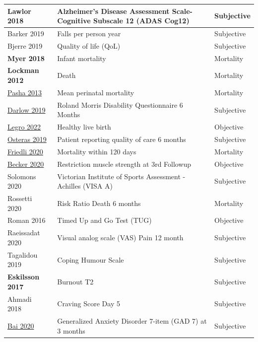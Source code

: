 \documentclass[sn-mathphys,Numbered]{sn-jnl}%
\begin{document}
\begin{longtable}{|p{4.2cm}|p{5.2cm}|p{1.9cm}|}
\hline
Lawlor 2018~\cite{lawlor2018nilvadipine} & Alzheimer's Disease Assessment Scale-Cognitive Subscale 12 (ADAS Cog12) & Subjective \\
\hline
Barker 2019~\cite{barker2019evaluation} & Falls per person year & Subjective \\
\hline
Bjerre 2019~\cite{bjerre2019community} & Quality of life (QoL) & Subjective \\
\hline
\textbf{Myer 2018}~\cite{myer2018integration} & Infant mortality & Mortality \\
\hline
\textbf{Lockman 2012}~\cite{lockman2012nevirapine} & Death & Mortality \\
\hline
\underline{Pasha 2013}~\cite{pasha2013combined} & Mean perinatal mortality & Mortality \\
\hline
\underline{Darlow 2019}~\cite{darlow2019fear} & Roland Morris Disability Questionnaire 6 Months & Subjective \\
\hline
\underline{Legro 2022}\cite{legro2022effects} & Healthy live birth & Objective \\ %
\hline
\underline{Osteras 2019}~\cite{osteraas2019implementing} & Patient reporting quality of care 6 months & Subjective \\
\hline
\underline{Friedli 2020}~\cite{friedli2020refeeding} & Mortality within 120 days & Mortality \\
\hline
\underline{Becker 2020}~\cite{becker2020prevention} & Restriction muscle strength at 3rd Followup & Objective \\
\hline
Solomons 2020~\cite{solomons2020intramuscular} & Victorian Institute of Sports Assessment - Achilles (VISA A) & Subjective \\
\hline
Rossetti 2020~\cite{rossetti2020continuous} & Risk Ratio Death 6 months & Mortality \\
\hline
Roman 2016~\cite{roman2016effects} & Timed Up and Go Test (TUG) & Objective \\
\hline
Raeissadat 2020~\cite{raeissadat2020platelet} & Visual analog scale (VAS) Pain 12 month & Subjective \\
\hline
Tagalidou 2019~\cite{tagalidou2019efficacy} & Coping Humour Scale & Subjective \\
\hline
\textbf{Eskilsson 2017}~\cite{eskilsson2017aerobic} & Burnout T2 & Subjective \\
\hline
Ahmadi 2018~\cite{ahmadi2018single} & Craving Score Day 5 & Subjective \\
\hline
\underline{Bai 2020}~\cite{bai2020randomised} & Generalized Anxiety Disorder 7-item (GAD 7) at 3 months & Subjective \\

\end{longtable}
\end{document}
